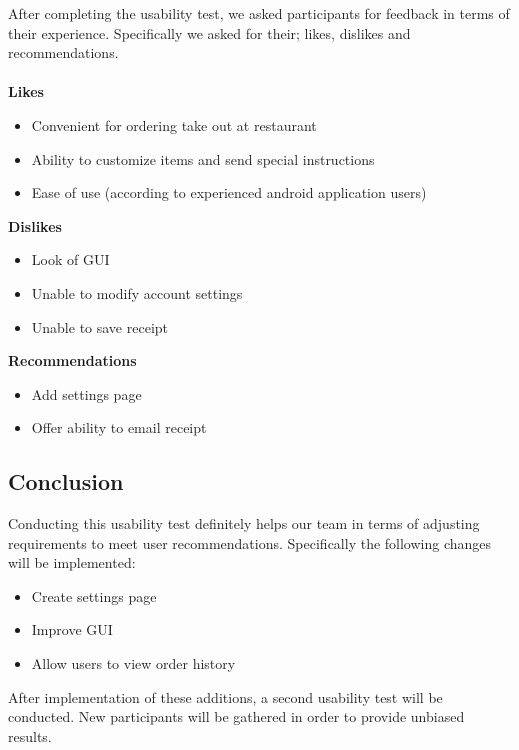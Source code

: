 \documentclass[12pt, titlepage]{article}
\begin{document}
After completing the usability test, we asked participants for feedback in terms of their experience. Specifically we asked for their; likes, dislikes and recommendations. 
\\\\
\textbf{Likes} 
\begin{itemize}
\item Convenient for ordering take out at restaurant  
\item Ability to customize items and send special instructions
\item Ease of use (according to experienced android application users)
\end{itemize}
\textbf{Dislikes}
\begin{itemize}
\item Look of GUI
\item Unable to modify account settings
\item Unable to save receipt 
\end{itemize}
\textbf{Recommendations}  
\begin{itemize}
\item Add settings page
\item Offer ability to email receipt
\end{itemize}
\subsection{Conclusion}
Conducting this usability test definitely helps our team in terms of adjusting requirements to meet user recommendations. Specifically the following changes will be implemented: 
\begin{itemize}
\item Create settings page
\item Improve GUI
\item Allow users to view order history
\end{itemize}
After implementation of these additions, a second usability test will be conducted. New participants will be gathered in order to provide unbiased results. 
\end{document}
